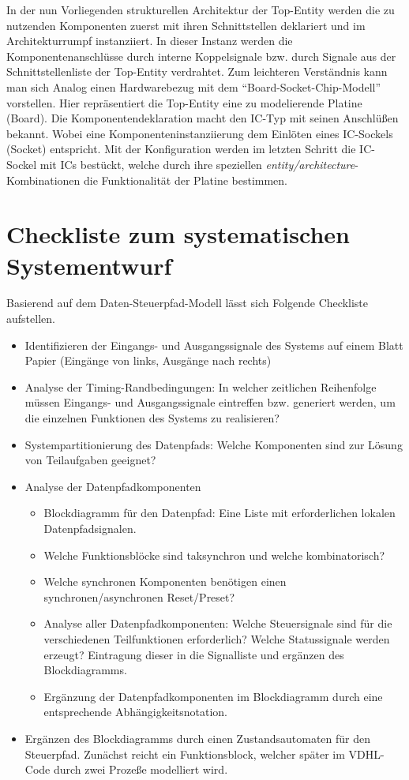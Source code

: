 \documentclass{article}
\begin{document}
\vspace{10mm}
In der nun Vorliegenden strukturellen Architektur der Top-Entity werden die zu nutzenden Komponenten
zuerst mit ihren Schnittstellen deklariert und im Architekturrumpf instanziiert. In dieser Instanz
werden die Komponentenanschlüsse durch interne Koppelsignale bzw. durch Signale aus der
Schnittstellenliste der Top-Entity verdrahtet.
Zum leichteren Verständnis kann man sich Analog einen Hardwarebezug mit dem 
"`Board-Socket-Chip-Modell"'\cite{Perry} vorstellen. Hier repräsentiert die Top-Entity eine zu 
modelierende Platine (Board). Die Komponentendeklaration macht den IC-Typ mit seinen Anschlüßen 
bekannt. Wobei eine Komponenteninstanziierung dem Einlöten eines IC-Sockels (Socket) entspricht.
Mit der Konfiguration werden im letzten Schritt die IC-Sockel mit ICs bestückt, welche durch ihre 
speziellen \emph{entity/architecture}-Kombinationen die Funktionalität der Platine bestimmen.
\cite{Reichardt}

\section{Checkliste zum systematischen Systementwurf}
Basierend auf dem Daten-Steuerpfad-Modell lässt sich Folgende Checkliste aufstellen.
\begin{itemize}
	\item 	Identifizieren der Eingangs- und Ausgangssignale des Systems auf einem Blatt Papier
  			(Eingänge von links, Ausgänge nach rechts)
	\item 	Analyse der Timing-Randbedingungen:
  			In welcher zeitlichen Reihenfolge müssen Eingangs- und Ausgangssignale eintreffen bzw. 
  			generiert werden, um die einzelnen Funktionen des Systems zu realisieren?
	\item 	Systempartitionierung des Datenpfads:
  			Welche Komponenten sind zur Lösung von Teilaufgaben geeignet?
	\item 	Analyse der Datenpfadkomponenten
  		\begin{itemize}
  			\item	Blockdiagramm für den Datenpfad:
					Eine Liste mit erforderlichen lokalen Datenpfadsignalen.
			\item	Welche Funktionsblöcke sind taksynchron und welche kombinatorisch?
			\item 	Welche synchronen Komponenten benötigen einen synchronen/asynchronen Reset/Preset?
			\item 	Analyse aller Datenpfadkomponenten:
					Welche Steuersignale sind für die verschiedenen Teilfunktionen erforderlich?
					Welche Statussignale werden erzeugt?
					Eintragung dieser in die Signalliste und ergänzen des Blockdiagramms.
			\item	Ergänzung der Datenpfadkomponenten im Blockdiagramm durch eine entsprechende
					Abhängigkeitsnotation. 
  		\end{itemize}
	\item	Ergänzen des Blockdiagramms durch einen Zustandsautomaten für den Steuerpfad. Zunächst
			reicht ein Funktionsblock, welcher später im VDHL-Code durch zwei Prozeße modelliert wird. 
\end{itemize}

\newpage

\listoffigures
\printindex
\end{document}
